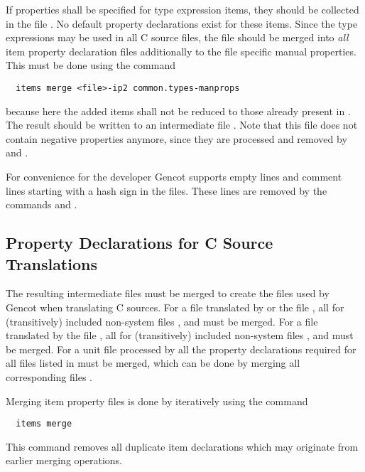 If properties shall be specified for type expression items, they should be collected in the file .
No default property declarations exist for these items. Since the type expressions may be used in all C source files, the 
file should be merged into \textit{all} item property declaration files additionally to the file specific manual properties.
This must be done using the command
\begin{verbatim}
  items merge <file>-ip2 common.types-manprops
\end{verbatim}
because here the added items shall not be reduced to those already present in . The result 
should be written to an intermediate file . Note that this file does not contain negative properties anymore,
since they are processed and removed by  and .

For convenience for the developer Gencot supports empty lines and comment lines starting with a hash sign \code{\#} in the 
 files. These lines are removed by the commands  and .

\subsection{Property Declarations for C Source Translations}
\label{app-itemprops-unit}

The resulting intermediate files  must be merged to create the files  used 
by Gencot when translating C sources. For a file  translated by  or 
the file , all  for (transitively) included non-system files , and 
must be merged. For a file  translated by 
the file , all  for (transitively) included non-system files , and 
must be merged. For a unit file  processed by  all the property declarations required
for all files  listed in  must be merged, which can be done by merging all corresponding
files .

Merging item property files is done by iteratively using the command
\begin{verbatim}
  items merge
\end{verbatim}
This command removes all duplicate item declarations which may originate from earlier merging operations.

